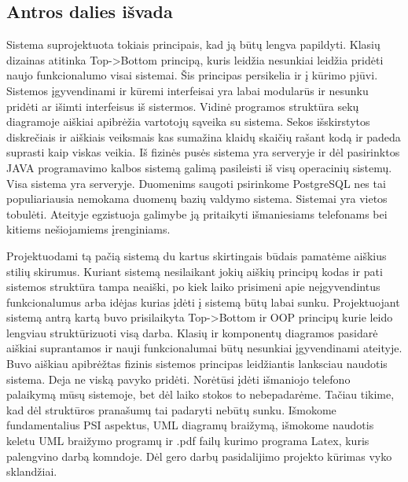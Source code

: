 \documentclass[oneside]{VUMIFPSkursinis}
\begin{document}
\subsection{Antros dalies išvada}
Sistema suprojektuota tokiais principais, kad ją būtų lengva papildyti. Klasių dizainas atitinka Top->Bottom principą, kuris leidžia nesunkiai leidžia pridėti naujo funkcionalumo visai sistemai. Šis principas persikelia ir į kūrimo pjūvi. Sistemos įgyvendinami ir kūremi interfeisai yra labai modularūs ir nesunku pridėti ar išimti interfeisus iš sistermos. Vidinė programos struktūra sekų diagramoje aiškiai apibrėžia vartotojų sąveika su sistema. Sekos išskirstytos diskrečiais ir aiškiais veiksmais kas sumažina klaidų skaičių rašant kodą ir padeda suprasti kaip viskas veikia. Iš fizinės pusės sistema yra serveryje ir dėl pasirinktos JAVA programavimo kalbos sistemą galimą pasileisti iš visų operacinių sistemų. Visa sistema yra serveryje. Duomenims saugoti psirinkome PostgreSQL nes tai populiariausia nemokama duomenų bazių valdymo sistema. Sistemai yra vietos tobulėti. Ateityje egzistuoja galimybe ją pritaikyti išmaniesiams telefonams bei kitiems nešiojamiems įrenginiams.



Projektuodami tą pačią sistemą du kartus skirtingais būdais pamatėme aiškius stilių skirumus. Kuriant sistemą nesilaikant jokių aiškių principų kodas ir pati sistemos struktūra tampa neaiški, po kiek laiko prisimeni apie neįgyvendintus funkcionalumus arba idėjas kurias įdėti į sistemą būtų labai sunku. Projektuojant sistemą antrą kartą buvo prisilaikyta Top->Bottom ir OOP principų kurie leido lengviau struktūrizuoti visą darba. Klasių ir komponentų diagramos pasidarė aiškiai suprantamos ir nauji funkcionalumai būtų nesunkiai įgyvendinami ateityje. Buvo aiškiau apibrėžtas fizinis sistemos principas leidžiantis lanksciau naudotis sistema. Deja ne viską pavyko pridėti. Norėtūsi įdėti išmaniojo telefono palaikymą mūsų sistemoje, bet dėl laiko stokos to nebepadarėme. Tačiau tikime, kad dėl struktūros pranašumų tai padaryti nebūtų sunku. Išmokome fundamentalius PSI aspektus, UML diagramų braižymą, išmokome naudotis keletu UML braižymo programų ir .pdf failų kurimo programa Latex, kuris palengvino darbą komndoje. Dėl gero darbų pasidalijimo projekto kūrimas vyko sklandžiai. 
\end{document}
